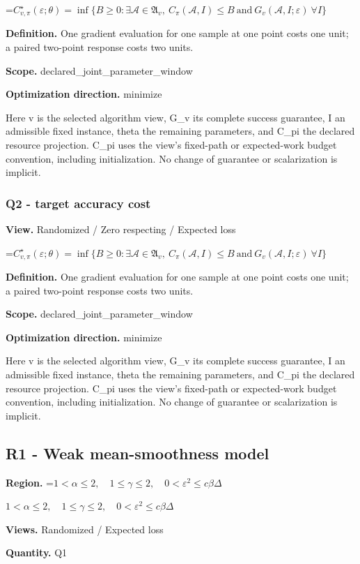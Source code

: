 \documentclass[10pt,a4paper]{article}
\newcommand{\AtlasMath}[1]{\par\begingroup\centering\setbox0=\hbox{$\displaystyle #1$}\ifdim\wd0>1.4\linewidth\typeout{ATLAS WIDE FORMULA: \the\wd0}\fi\ifdim\wd0>\linewidth\resizebox{\linewidth}{!}{\box0}\else\box0\fi\par\endgroup}
\newcommand{\AtlasInlineMath}[1]{\begingroup\setbox0=\hbox{$#1$}\ifdim\wd0>.4\linewidth\endgroup\AtlasMath{#1}\else\endgroup$#1$\fi}
\begin{document}
\AtlasMath{C^\star_{v,\pi}(\varepsilon;\theta)=\inf\{B\ge0:\exists\mathcal A\in\mathfrak A_v,\ C_\pi(\mathcal A,I)\le B\ \text{and}\ G_v(\mathcal A,I;\varepsilon)\ \forall I\}}
\textbf{Definition.} One gradient evaluation for one sample at one point costs one unit; a paired two-point response costs two units.

\textbf{Scope.} declared\_joint\_parameter\_window

\textbf{Optimization direction.} minimize

Here v is the selected algorithm view, G\_v its complete success guarantee, I an admissible fixed instance, theta the remaining parameters, and C\_pi the declared resource projection. C\_pi uses the view's fixed-path or expected-work budget convention, including initialization. No change of guarantee or scalarization is implicit.

\subsubsection{Q2 - target accuracy cost}
\textbf{View.} Randomized / Zero respecting / Expected loss

\AtlasMath{C^\star_{v,\pi}(\varepsilon;\theta)=\inf\{B\ge0:\exists\mathcal A\in\mathfrak A_v,\ C_\pi(\mathcal A,I)\le B\ \text{and}\ G_v(\mathcal A,I;\varepsilon)\ \forall I\}}
\textbf{Definition.} One gradient evaluation for one sample at one point costs one unit; a paired two-point response costs two units.

\textbf{Scope.} declared\_joint\_parameter\_window

\textbf{Optimization direction.} minimize

Here v is the selected algorithm view, G\_v its complete success guarantee, I an admissible fixed instance, theta the remaining parameters, and C\_pi the declared resource projection. C\_pi uses the view's fixed-path or expected-work budget convention, including initialization. No change of guarantee or scalarization is implicit.

\subsection{R1 - Weak mean-smoothness model}
\textbf{Region.} \AtlasInlineMath{1<\alpha\le2,\quad1\le\gamma\le2,\quad0<\varepsilon^2\le c\beta\Delta}

\textbf{Views.} Randomized / Expected loss

\textbf{Quantity.} Q1
\end{document}
